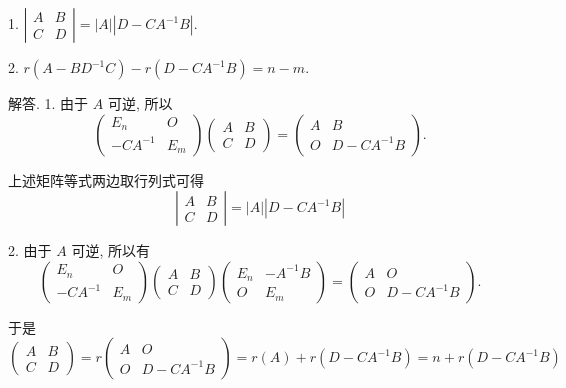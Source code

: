 \documentclass{article}
\begin{document}
1. $\left|\begin{array}{ll}A & B \\ C & D\end{array}\right|=|A|\left|D-C A^{-1} B\right|$.

2. $r\left(A-B D^{-1} C\right)-r\left(D-C A^{-1} B\right)=n-m$.

解答. 1. 由于 $A$ 可逆, 所以
$$
    \left(\begin{array}{cc}
            E_{n}     & O     \\
            -C A^{-1} & E_{m}
        \end{array}\right)\left(\begin{array}{ll}
            A & B \\
            C & D
        \end{array}\right)=\left(\begin{array}{cc}
            A & B            \\
            O & D-C A^{-1} B
        \end{array}\right) .
$$

上述矩阵等式两边取行列式可得
$$
    \left|\begin{array}{cc}
        A & B \\
        C & D
    \end{array}\right|=|A|\left|D-C A^{-1} B\right|
$$

2. 由于 $A$ 可逆, 所以有
$$
    \left(\begin{array}{cc}
            E_{n}     & O     \\
            -C A^{-1} & E_{m}
        \end{array}\right)\left(\begin{array}{cc}
            A & B \\
            C & D
        \end{array}\right)\left(\begin{array}{cc}
            E_{n} & -A^{-1} B \\
            O     & E_{m}
        \end{array}\right)=\left(\begin{array}{cc}
            A & O            \\
            O & D-C A^{-1} B
        \end{array}\right) .
$$

于是
\begin{equation}
    \left(\begin{array}{cc}A & B \\ C & D\end{array}\right)=r\left(\begin{array}{cc}A & O \\ O & D-C A^{-1} B\end{array}\right)=r(A)+r\left(D-C A^{-1} B\right)=n+r\left(D-C A^{-1} B\right)
    \tag{1}
\end{equation}
\end{document}

